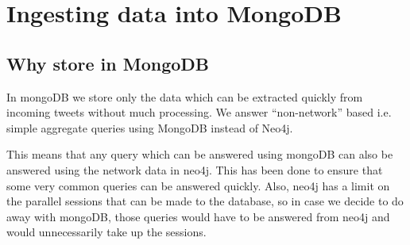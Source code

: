 \documentclass[letterpaper,10pt,english]{sphinxmanual}
\begin{document}
\begin{fulllineitems}
\begin{fulllineitems}
\label{\detokenize{neo4j_data_ingestion:ingest_neo4j_user_timeline.Neo4jIngestion_UserTimeline.update_friends}}
\end{fulllineitems}


\begin{fulllineitems}
\label{\detokenize{neo4j_data_ingestion:ingest_neo4j_user_timeline.Neo4jIngestion_UserTimeline.update_user}}
\end{fulllineitems}


\end{fulllineitems}


\begin{fulllineitems}
\label{\detokenize{neo4j_data_ingestion:ingest_neo4j_user_timeline.log}}
\end{fulllineitems}



\chapter{Ingesting data into MongoDB}
\label{\detokenize{mongoDB_data_ingestion:ingesting-data-into-mongodb}}\label{\detokenize{mongoDB_data_ingestion::doc}}

\section{Why store in MongoDB}
\label{\detokenize{mongoDB_data_ingestion:why-store-in-mongodb}}
In mongoDB we store only the data which can be extracted quickly from incoming tweets without much processing. We answer “non-network” based i.e. simple aggregate queries using MongoDB instead of Neo4j.

This means that any query which can be answered using mongoDB can also be answered using the network data in neo4j. This has been done to ensure that some very common queries can be answered quickly. Also, neo4j has a limit on the parallel sessions that can be made to the database, so in case we decide to do away with mongoDB, those queries would have to be answered from neo4j and would unnecessarily take up the sessions.
\end{document}
